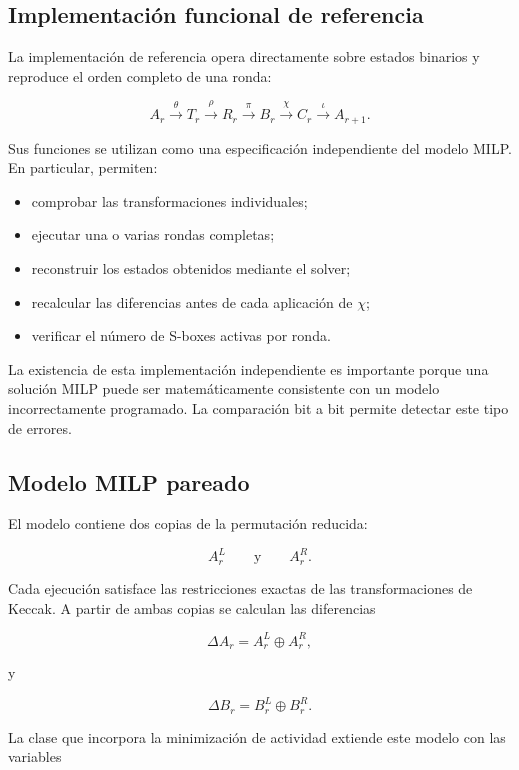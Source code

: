 \subsection{Implementación funcional de referencia}
\label{subsec:implementacion_referencia}

La implementación de referencia opera directamente sobre estados
binarios y reproduce el orden completo de una ronda:

\[
A_r
\xrightarrow{\theta}
T_r
\xrightarrow{\rho}
R_r
\xrightarrow{\pi}
B_r
\xrightarrow{\chi}
C_r
\xrightarrow{\iota}
A_{r+1}.
\]

Sus funciones se utilizan como una especificación independiente del
modelo MILP. En particular, permiten:

\begin{itemize}
    \item comprobar las transformaciones individuales;
    \item ejecutar una o varias rondas completas;
    \item reconstruir los estados obtenidos mediante el solver;
    \item recalcular las diferencias antes de cada aplicación de $\chi$;
    \item verificar el número de S-boxes activas por ronda.
\end{itemize}

La existencia de esta implementación independiente es importante porque
una solución MILP puede ser matemáticamente consistente con un modelo
incorrectamente programado. La comparación bit a bit permite detectar
este tipo de errores.


\subsection{Modelo MILP pareado}
\label{subsec:implementacion_modelo_pareado}

El modelo contiene dos copias de la permutación reducida:

\[
A_r^L
\qquad \text{y} \qquad
A_r^R.
\]

Cada ejecución satisface las restricciones exactas de las
transformaciones de Keccak. A partir de ambas copias se calculan las
diferencias

\[
\Delta A_r
=
A_r^L \oplus A_r^R,
\]

y

\[
\Delta B_r
=
B_r^L \oplus B_r^R.
\]

La clase que incorpora la minimización de actividad extiende este modelo
con las variables

